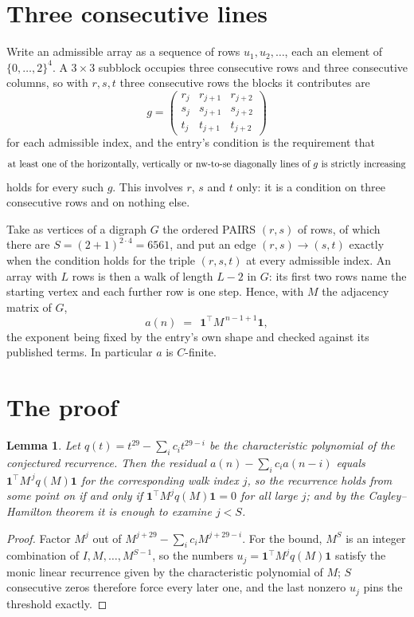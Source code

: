 \documentclass[11pt,a4paper]{article}
\theoremstyle{plain}
\newtheorem{lemma}[theorem]{Lemma}
\theoremstyle{definition}
\begin{document}
\section{Three consecutive lines}

Write an admissible array as a sequence of rows $u_1,u_2,\dots$, each an element of
$\{0,\dots,2\}^{4}$. A $3\times3$ subblock occupies three consecutive rows and
three consecutive columns, so with $r,s,t$ three consecutive rows the blocks it
contributes are
\[
g=\begin{pmatrix}r_j&r_{j+1}&r_{j+2}\\ s_j&s_{j+1}&s_{j+2}\\ t_j&t_{j+1}&t_{j+2}\end{pmatrix}
\]
for each admissible index, and the entry's condition is the requirement that
\[
\text{at least one}\text{ of the horizontally, vertically or nw-to-se diagonally lines of }g\text{ \text{is strictly increasing}}
\]
holds for every such $g$. This involves $r$, $s$ and $t$ only: it is a condition on
three consecutive rows and on nothing else.

Take as vertices of a digraph $G$ the ordered PAIRS $(r,s)$ of rows, of which there are
$S=(2+1)^{2\cdot4}=6561$, and put an edge $(r,s)\to(s,t)$ exactly when the condition
holds for the triple $(r,s,t)$ at every admissible index. An array with $L$ rows is then a
walk of length $L-2$ in $G$: its first two rows name the starting vertex and each further
row is one step. Hence, with $M$ the adjacency matrix of $G$,
\[
a(n)\;=\;\,\mathbf{1}^{\!\top}M^{\,n-1+1}\mathbf{1},
\]
the exponent being fixed by the entry's own shape and checked against its published terms.
In particular $a$ is $C$-finite.

\section{The proof}

\begin{lemma}\label{lem:crit}
Let $q(t)=t^{29}-\sum_i c_it^{29-i}$ be the characteristic polynomial of the
conjectured recurrence. Then the residual $a(n)-\sum_ic_ia(n-i)$ equals
$\mathbf{1}^{\!\top}M^{\,j}q(M)\mathbf{1}$ for the corresponding walk index
$j$, so the recurrence holds from some point on if and only if
$\mathbf{1}^{\!\top}M^{j}q(M)\mathbf{1}=0$ for all large $j$; and by the
Cayley--Hamilton theorem it is enough to examine $j<S$.
\end{lemma}

\begin{proof}
Factor $M^{j}$ out of $M^{j+29}-\sum_ic_iM^{j+29-i}$. For the bound, $M^{S}$
is an integer combination of $I,M,\dots,M^{S-1}$, so the numbers
$u_j=\mathbf{1}^{\!\top}M^{j}q(M)\mathbf{1}$ satisfy the monic linear recurrence given by
the characteristic polynomial of $M$; $S$ consecutive zeros therefore force every later one,
and the last nonzero $u_j$ pins the threshold exactly.
\end{proof}
\end{document}
